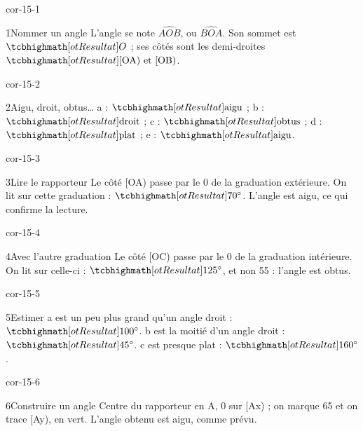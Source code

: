 \clearpage\pagestyle{otMain}\setlength{\otBlocEspacement}{2.5mm}\fontsize{11}{15}\selectfont{}
\begin{blocLivre}{cor-15-1}\begin{corrige}{1}{Nommer un angle}
L’angle se note $\widehat{AOB}$, ou $\widehat{BOA}$. Son sommet est $\res O$ ; ses côtés sont les demi-droites $\res{\text{[OA) et [OB)}}$.
\label{fig-cor-15-1}
\end{corrige}\end{blocLivre}
\begin{blocLivre}{cor-15-2}\begin{corrige}{2}{Aigu, droit, obtus…}
a : $\res{\text{aigu}}$ ; b : $\res{\text{droit}}$ ; c : $\res{\text{obtus}}$ ; d : $\res{\text{plat}}$ ; e : $\res{\text{aigu}}$.
\label{fig-cor-15-2}
\end{corrige}\end{blocLivre}
\begin{blocLivre}{cor-15-3}\begin{corrige}{3}{Lire le rapporteur}
Le côté [OA) passe par le 0 de la graduation extérieure. On lit sur cette graduation : $\res{70^\circ}$. L’angle est aigu, ce qui confirme la lecture.
\label{fig-cor-15-3}
\end{corrige}\end{blocLivre}
\begin{blocLivre}{cor-15-4}\begin{corrige}{4}{Avec l’autre graduation}
Le côté [OC) passe par le 0 de la graduation intérieure. On lit sur celle-ci : $\res{125^\circ}$, et non 55 : l’angle est obtus.
\label{fig-cor-15-4}
\end{corrige}\end{blocLivre}
\begin{blocLivre}{cor-15-5}\begin{corrige}{5}{Estimer}
a est un peu plus grand qu’un angle droit : $\res{100^\circ}$. b est la moitié d’un angle droit : $\res{45^\circ}$. c est presque plat : $\res{160^\circ}$.
\label{fig-cor-15-5}
\end{corrige}\end{blocLivre}
\begin{blocLivre}{cor-15-6}\begin{corrige}{6}{Construire un angle}
Centre du rapporteur en A, 0 sur [Ax) ; on marque 65 et on trace [Ay), en vert. L’angle obtenu est aigu, comme prévu.
\label{fig-cor-15-6}
\end{corrige}\end{blocLivre}
